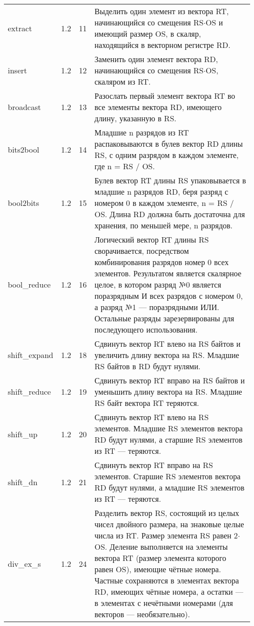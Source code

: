 \documentclass[forwardcom.tex]{subfiles}
\begin{document}
\begin{longtable}{|p{25mm}|p{16mm}|p{9mm}|p{99mm}|}
extract          & 1.2 & 11 & Выделить один элемент из вектора RT, начинающийся со смещения RS$\cdot$OS и имеющий размер OS, в скаляр, находящийся в векторном регистре RD. \\
insert           & 1.2 & 12 & Заменить один элемент вектора RD, начинающийся со смещения RS$\cdot$OS, скаляром из RT. \\
broadcast        & 1.2 & 13 & Разослать первый элемент вектора RT во все элементы вектора RD, имеющего длину, указанную в RS. \\
bits2bool        & 1.2 & 14 & Младшие n разрядов из RT распаковываются в булев вектор RD длины RS, с одним разрядом в каждом элементе, где n = RS / OS. \\
bool2bits        & 1.2 & 15 & Булев вектор RT длины RS упаковывается в младшие n разрядов RD, беря разряд с номером 0 в каждом элементе, n = RS / OS. Длина RD должна быть достаточна для хранения, по меньшей мере, n разрядов. \\
bool\_reduce     & 1.2 & 16 & Логический вектор RT длины RS сворачивается, посредством комбинирования разрядов номер 0 всех элементов. Результатом является скалярное целое, в котором разряд №0 является поразрядным И всех разрядов с номером 0, а разряд №1 --- поразрядными ИЛИ. Остальные разряды зарезервированы для последующего использования. \\
shift\_expand    & 1.2 & 18 & Сдвинуть вектор RT влево на RS байтов и увеличить длину вектора на RS. Младшие RS байтов в RD будут нулями. \\
shift\_reduce    & 1.2 & 19 & Сдвинуть вектор RT вправо на RS байтов и уменьшить длину вектора на RS. Младшие RS байт вектора RT теряются. \\
shift\_up        & 1.2 & 20 & Сдвинуть вектор RT влево на RS элементов. Младшие RS элементов вектора RD будут нулями, а старшие RS элементов из RT --- теряются. \\
shift\_dn        & 1.2 & 21 & Сдвинуть вектор RT вправо на RS элементов. Старшие RS элементов вектора RD будут нулями, а младшие RS элементов из RT --- теряются. \\
div\_ex\_s       & 1.2 & 24 & Разделить вектор RS, состоящий из целых чисел двойного размера, на знаковые целые числа из RT. Размер элемента RS равен 2$\cdot$OS. Деление выполняется на элементы вектора RT (размер элемента которого равен OS), имеющие чётные номера. Частные сохраняются в элементах вектора RD, имеющих чётные номера, а остатки --- в элементах с нечётными номерами (для векторов --- необязательно). \\

\end{longtable}
\end{document}
